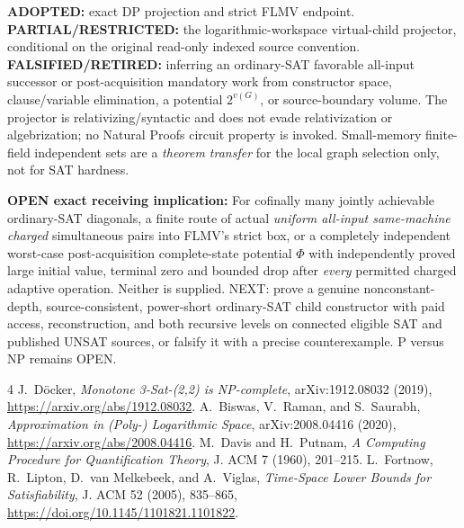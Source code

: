 \documentclass[11pt]{article}
\begin{document}
\textbf{ADOPTED:} exact DP projection and strict FLMV endpoint. \textbf{PARTIAL/RESTRICTED:} the logarithmic-workspace virtual-child projector, conditional on the original read-only indexed source convention. \textbf{FALSIFIED/RETIRED:} inferring an ordinary-SAT favorable all-input successor or post-acquisition mandatory work from constructor space, clause/variable elimination, a potential $2^{v(G)}$, or source-boundary volume. The projector is relativizing/syntactic and does not evade relativization or algebrization; no Natural Proofs circuit property is invoked. Small-memory finite-field independent sets are a \emph{theorem transfer} for the local graph selection only, not for SAT hardness.

\textbf{OPEN exact receiving implication:} For cofinally many jointly achievable ordinary-SAT diagonals, a finite route of actual \emph{uniform all-input same-machine charged} simultaneous pairs into FLMV's strict box, or a completely independent worst-case post-acquisition complete-state potential $\Phi$ with independently proved large initial value, terminal zero and bounded drop after \emph{every} permitted charged adaptive operation. Neither is supplied. NEXT: prove a genuine nonconstant-depth, source-consistent, power-short ordinary-SAT child constructor with paid access, reconstruction, and both recursive levels on connected eligible SAT and published UNSAT sources, or falsify it with a precise counterexample. P versus NP remains OPEN.

\begin{thebibliography}{4}
 J.~D\"ocker, \emph{Monotone 3-Sat-(2,2) is NP-complete}, arXiv:1912.08032 (2019), \url{https://arxiv.org/abs/1912.08032}.
 A.~Biswas, V.~Raman, and S.~Saurabh, \emph{Approximation in (Poly-) Logarithmic Space}, arXiv:2008.04416 (2020), \url{https://arxiv.org/abs/2008.04416}.
 M.~Davis and H.~Putnam, \emph{A Computing Procedure for Quantification Theory}, J. ACM 7 (1960), 201--215.
 L.~Fortnow, R.~Lipton, D.~van Melkebeek, and A.~Viglas, \emph{Time-Space Lower Bounds for Satisfiability}, J. ACM 52 (2005), 835--865, \url{https://doi.org/10.1145/1101821.1101822}.
\end{thebibliography}
\end{document}
